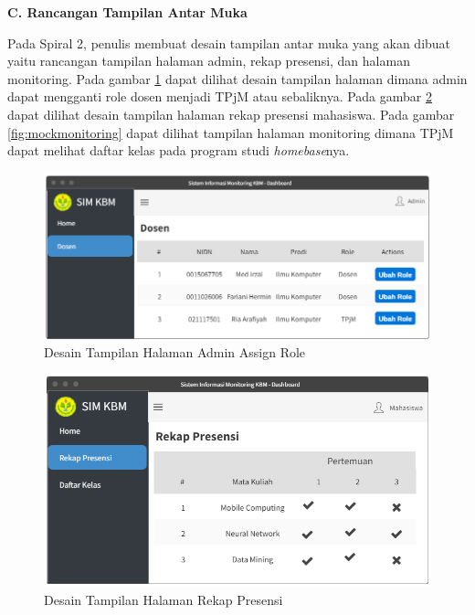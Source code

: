 \textbf{C. Rancangan Tampilan Antar Muka}

	Pada Spiral 2, penulis membuat desain tampilan antar muka yang akan dibuat yaitu rancangan tampilan halaman admin, rekap presensi, dan halaman monitoring. Pada gambar \ref{fig:mockadmin} dapat dilihat desain tampilan halaman dimana admin dapat mengganti role dosen menjadi TPjM atau sebaliknya. Pada gambar \ref{fig:mockrekappresensi} dapat dilihat desain tampilan halaman rekap presensi mahasiswa. Pada gambar \ref{fig:mockmonitoring} dapat dilihat tampilan halaman monitoring dimana TPjM dapat melihat daftar kelas pada program studi \textit{homebase}nya.

\begin{figure}[h!]
	\centering
	\includegraphics[width=1\textwidth]{gambar/mockup/admin_dosen}
	\caption{Desain Tampilan Halaman Admin Assign Role}
	\label{fig:mockadmin}
\end{figure}

\begin{figure}[h!]
	\centering
	\includegraphics[width=1\textwidth]{gambar/mockup/rekap_presensi}
	\caption{Desain Tampilan Halaman Rekap Presensi}
	\label{fig:mockrekappresensi}
\end{figure}

